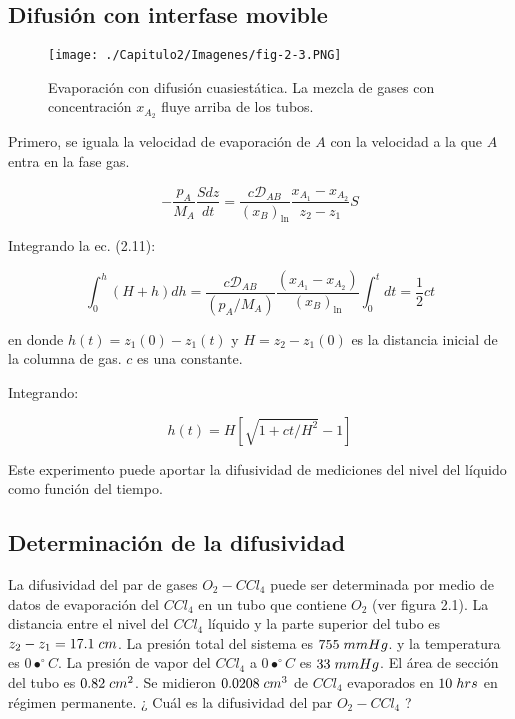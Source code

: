 \subsection{Difusión con interfase movible}

\begin{figure}[H]
	\centering
	\texttt{[image: ./Capitulo2/Imagenes/fig-2-3.PNG]}
	\caption{Evaporación con difusión cuasiestática. La mezcla de gases con concentración $x_{A_2}$ fluye arriba de los tubos.}
	\end{figure}
	
Primero, se iguala la velocidad de evaporación de $A$ con la velocidad a la que $A$ entra en la fase gas.

\begin{equation}
-\frac{p_A}{M_A} \frac{Sdz}{dt} = \frac{c \mathscr{D}_{AB}}{(x_B)_{\ln}} \frac{x_{A_1}-x_{A_2}}{z_2 - z_1} S
\end{equation}

Integrando la ec. (2.11): 

\begin{equation}
	\int_0^h (H+h)dh = \frac{c \mathscr{D}_{AB}}{(p_A/M_A)} \frac{(x_{A_1}-x_{A_2})}{(x_B)_{\ln}} \int_0^t dt = \frac{1}{2}c t
\end{equation}

en donde $h(t) = z_1(0) - z_1(t)$ y $H = z_2 - z_1(0)$ es la distancia inicial de la columna de gas. $c$ es una constante.

Integrando: 

\begin{equation}
	h(t) = H \left[ \sqrt{1+ct/H^2}-1 \right]
\end{equation}

Este experimento puede aportar la difusividad de mediciones del nivel del líquido como función del tiempo.

\subsection{Determinación de la difusividad}

La difusividad del par de gases $O_2 - CCl_4$ puede ser determinada por medio de datos de evaporación del $CCl_4$ en un tubo que contiene $O_2$ (ver figura 2.1). La distancia entre el nivel del $CCl_4$ líquido y la parte superior del tubo es $z_2 - z_1 = 17.1 \hspace{0.1cm} cm$. La presión total del sistema es $755 \hspace{0.1cm} mmHg$. y la temperatura es $0•^\circ C$. La presión de vapor del $CCl_4$ a $0•^\circ C$ es $33 \hspace{0.1cm} mmHg$. El área de sección del tubo es $0.82 \hspace{0.1cm} cm^2$. Se midieron $0.0208 \hspace{0.1cm} cm^3$ de $CCl_4$ evaporados en $10 \hspace{0.1cm} hrs$ en régimen permanente. ¿ Cuál es la difusividad del par $O_2 - CCl_4$ ?

